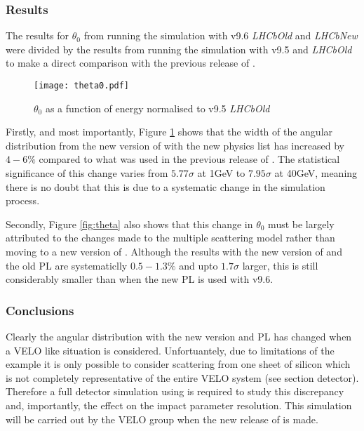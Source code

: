 \subsubsection{Results}
\label{sec:MscResults}
The results for $\theta_0$ from running the simulation with v9.6 \textit{LHCbOld} and \textit{LHCbNew} were divided by the results from running the simulation with v9.5 and \textit{LHCbOld} to make a direct comparison with the previous release of \geant.
\begin{figure}[h]
  \centering
  \texttt{[image: theta0.pdf]}
  \caption{$\theta_0$ as a function of energy normalised to \geant v9.5 \textit{LHCbOld}}
  \label{fig:theta0}
\end{figure}

Firstly, and most importantly, Figure \ref{fig:theta0} shows that the width of the angular distribution from the new version of \geant with the new physics list has increased by $4-6\%$ compared to what was used in the previous release of \geant.  The statistical significance of this change varies from $5.77\sigma$ at 1GeV to $7.95\sigma$ at 40GeV, meaning there is no doubt that this is due to a systematic change in the simulation process.

Secondly, Figure \ref{fig:theta} also shows that this change in $\theta_0$ must be largely attributed to the changes made to the multiple scattering model rather than moving to a new version of \geant.  Although the results with the new version of \geant and the old PL are systematiclly $0.5-1.3\%$ and upto $1.7\sigma$ larger, this is still considerably smaller than when the new PL is used with v9.6.

\subsubsection{Conclusions}
\label{sec:Conclusions}
Clearly the angular distribution with the new \geant version and PL has changed when a \lhcb VELO like situation is considered.  Unfortuantely, due to limitations of the \geant example it is only possible to consider scattering from one sheet of silicon which is not completely representative of the entire VELO system (see section detector).  Therefore a full detector simulation using \gauss is required to study this discrepancy and, importantly, the effect on the impact parameter resolution.  This simulation will be carried out by the \lhcb VELO group when the new release of \gauss is made.

\clearpage
